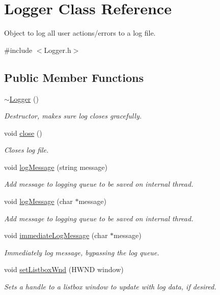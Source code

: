 \hypertarget{class_logger}{
\section{Logger Class Reference}
\label{class_logger}
}


Object to log all user actions/errors to a log file.  




{\ttfamily \#include $<$Logger.h$>$}

\subsection*{Public Member Functions}
\begin{DoxyCompactItemize}
\item 
\hypertarget{class_logger_acb668a9e186a25fbaad2e4af6d1ed00a}{
\hyperlink{class_logger_acb668a9e186a25fbaad2e4af6d1ed00a}{$\sim$Logger} ()}
\label{class_logger_acb668a9e186a25fbaad2e4af6d1ed00a}

\begin{DoxyCompactList}\small\item\em Destructor, makes sure log closes gracefully. \end{DoxyCompactList}\item 
\hypertarget{class_logger_afee2bab560c2db0190c980884d33868c}{
void \hyperlink{class_logger_afee2bab560c2db0190c980884d33868c}{close} ()}
\label{class_logger_afee2bab560c2db0190c980884d33868c}

\begin{DoxyCompactList}\small\item\em Closes log file. \end{DoxyCompactList}\item 
void \hyperlink{class_logger_ae731083d86f9bb1112b2063b54a8e708}{logMessage} (string message)
\begin{DoxyCompactList}\small\item\em Add message to logging queue to be saved on internal thread. \end{DoxyCompactList}\item 
void \hyperlink{class_logger_a60fa9ef21a0724f276f63d25a85e23a6}{logMessage} (char $\ast$message)
\begin{DoxyCompactList}\small\item\em Add message to logging queue to be saved on internal thread. \end{DoxyCompactList}\item 
void \hyperlink{class_logger_afc56884e04c3fdaed86364491201ce1e}{immediateLogMessage} (char $\ast$message)
\begin{DoxyCompactList}\small\item\em Immediately log message, bypassing the log queue. \end{DoxyCompactList}\item 
void \hyperlink{class_logger_a73c4ba19d62c077ce82138dfd1a4a3c6}{setListboxWnd} (HWND window)
\begin{DoxyCompactList}\small\item\em Sets a handle to a listbox window to update with log data, if desired. \end{DoxyCompactList}\end{DoxyCompactItemize}
